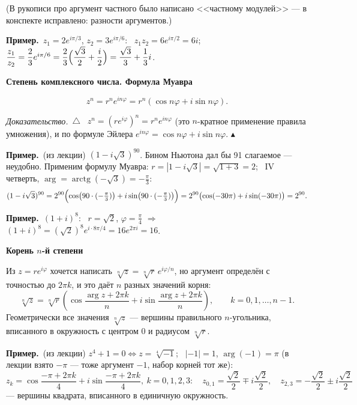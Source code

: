\documentclass[a4paper,11pt]{article}
\newcommand{\prim}{\par\smallskip\noindent\textbf{\textcolor{teoc!80!black}{Пример.}}\ }
\newenvironment{dok}
  {\par\smallskip\noindent\textit{Доказательство.}\ $\triangle$\ \ignorespaces}
  {\unskip\nobreak\hfill$\blacktriangle$\par\smallskip}
\newcommand{\podr}[1]{\par\needspace{8\baselineskip}\medskip
  {\large\bfseries\textcolor{oprc!80!black}{#1}}\par\nopagebreak\smallskip}
\begin{document}
{\small\textcolor{zamc}{(В рукописи про аргумент частного было написано <<частному модулей>> --- в конспекте исправлено: разности аргументов.)}}

\prim $z_1 = 2e^{i\pi/3}$, $z_2 = 3e^{i\pi/6}$: \
$z_1 z_2 = 6 e^{i\pi/2} = 6i$; \
$\dfrac{z_1}{z_2} = \dfrac23 e^{i\pi/6} = \dfrac23\Bigl(\dfrac{\sqrt3}{2} + \dfrac i2\Bigr) = \dfrac{\sqrt3}{3} + \dfrac13 i$.

\podr{Степень комплексного числа. Формула Муавра}

\begin{teo}
\[
  z^n = r^n e^{in\varphi} = r^n(\cos n\varphi + i\sin n\varphi).
\]
\end{teo}

\begin{dok}
$z^n = (re^{i\varphi})^n = r^n e^{in\varphi}$ (это $n$-кратное применение правила умножения), и по формуле Эйлера
$e^{in\varphi} = \cos n\varphi + i\sin n\varphi$.
\end{dok}

\prim (из лекции) $(1 - i\sqrt3)^{90}$. Бином Ньютона дал бы 91 слагаемое --- неудобно. Применим формулу Муавра:
$r = |1 - i\sqrt3| = \sqrt{1 + 3} = 2$; \ IV четверть, $\arg = \operatorname{arctg}(-\sqrt3) = -\frac\pi3$:
\[
  (1 - i\sqrt3)^{90} = 2^{90}\Bigl(\cos\bigl(90 \cdot (-\tfrac\pi3)\bigr) + i\sin\bigl(90 \cdot (-\tfrac\pi3)\bigr)\Bigr)
  = 2^{90}\bigl(\cos(-30\pi) + i\sin(-30\pi)\bigr) = 2^{90}.
\]

\prim $(1 + i)^8$: \ $r = \sqrt2$, $\varphi = \frac\pi4$ $\Rightarrow$ $(1 + i)^8 = (\sqrt2)^8 e^{i \cdot 8\pi/4} = 16 e^{2\pi i} = 16$.

\podr{Корень $n$-й степени}

Из $z = re^{i\varphi}$ хочется написать $\sqrt[n]z = \sqrt[n]r\, e^{i\varphi/n}$, но аргумент определён с точностью до $2\pi k$,
и это даёт $n$ разных значений корня:
\[
  \sqrt[n]{z} = \sqrt[n]{r}\left(\cos\frac{\arg z + 2\pi k}{n} + i\sin\frac{\arg z + 2\pi k}{n}\right), \qquad k = 0, 1, \dots, n - 1.
\]
Геометрически все значения $\sqrt[n]{z}$ --- вершины правильного $n$-угольника, вписанного в окружность с центром $0$ и радиусом $\sqrt[n]{r}$.

\prim (из лекции) $z^4 + 1 = 0 \Leftrightarrow z = \sqrt[4]{-1}$; \ $|-1| = 1$, $\arg(-1) = \pi$ (в лекции взято $-\pi$ --- тоже аргумент $-1$,
набор корней тот же):
\[
  z_k = \cos\frac{-\pi + 2\pi k}{4} + i\sin\frac{-\pi + 2\pi k}{4}, \ k = 0, 1, 2, 3:
  \quad z_{0,1} = \frac{\sqrt2}{2} \mp i\frac{\sqrt2}{2}, \quad z_{2,3} = -\frac{\sqrt2}{2} \pm i\frac{\sqrt2}{2}
\]
--- вершины квадрата, вписанного в единичную окружность.
\end{document}
